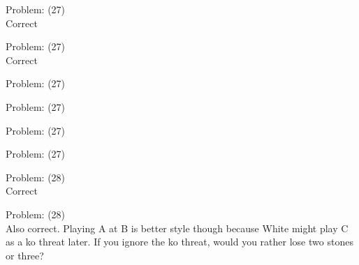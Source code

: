 \documentclass[11pt]{article}
\begin{document}
\begin{minipage}[t]{0.5\textwidth}
  {\centering
  
  Problem: (27)\\
  Correct\\
  }
\end{minipage}
\begin{minipage}[t]{0.5\textwidth}
  {\centering
  
  Problem: (27)\\
  Correct\\
  }
\end{minipage}
\begin{minipage}[t]{0.5\textwidth}
  {\centering
  
  Problem: (27)\\
  
  }
\end{minipage}
\begin{minipage}[t]{0.5\textwidth}
  {\centering
  
  Problem: (27)\\
  
  }
\end{minipage}
\begin{minipage}[t]{0.5\textwidth}
  {\centering
  
  Problem: (27)\\
  
  }
\end{minipage}
\begin{minipage}[t]{0.5\textwidth}
  {\centering
  
  Problem: (27)\\
  
  }
\end{minipage}
\begin{minipage}[t]{0.5\textwidth}
  {\centering
  
  Problem: (28)\\
  Correct\\
  }
\end{minipage}
\begin{minipage}[t]{0.5\textwidth}
  {\centering
  
  Problem: (28)\\
  Also correct. Playing A at B is better style though because White might play C as a ko threat later. If you ignore the ko threat, would you rather lose two stones or three?\\
  }
\end{minipage}
\end{document}
